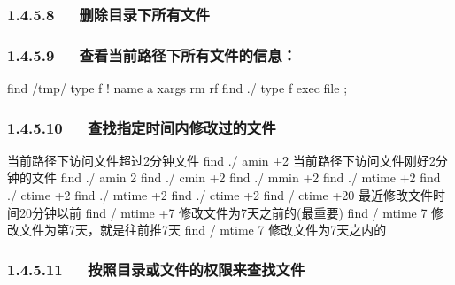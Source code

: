 \documentclass[letterpaper,12pt,english]{sphinxmanual}
\begin{document}
\subsubsection{1.4.5.8   删除目录下所有文件}
\label{\detokenize{001software/001install/linux:id12}}
\begin{sphinxVerbatim}[commandchars=\\\{\}]
        \PYGZbs{}
       
\end{sphinxVerbatim}


\subsubsection{1.4.5.9   查看当前路径下所有文件的信息：}
\label{\detokenize{001software/001install/linux:id13}}
\begin{sphinxVerbatim}[commandchars=\\\{\}]
find /tmp/ \PYGZhy{}type f ! \PYGZhy{}name a \textbar{}xargs rm \textendash{}rf
find ./ \PYGZhy{}type f \PYGZhy{}exec file \PYGZob{}\PYGZcb{} \PYGZbs{};
\end{sphinxVerbatim}


\subsubsection{1.4.5.10   查找指定时间内修改过的文件}
\label{\detokenize{001software/001install/linux:id14}}
\begin{sphinxVerbatim}[commandchars=\\\{\}]
\PYGZsh{} 当前路径下访问文件超过2分钟文件
find ./ \PYGZhy{}amin +2
\PYGZsh{} 当前路径下访问文件刚好2分钟的文件
find ./ \PYGZhy{}amin 2
find ./ \PYGZhy{}cmin +2
find ./ \PYGZhy{}mmin +2
find ./ \PYGZhy{}mtime +2
find ./ \PYGZhy{}ctime +2
find ./ \PYGZhy{}mtime +2
find ./ \PYGZhy{}ctime +2
find / \PYGZhy{}ctime  +20  最近修改文件时间20分钟以前
find / \PYGZhy{}mtime  +7   修改文件为7天之前的(最重要)
find / \PYGZhy{}mtime  7    修改文件为第7天，就是往前推7天
find / \PYGZhy{}mtime  \PYGZhy{}7   修改文件为7天之内的
\end{sphinxVerbatim}


\subsubsection{1.4.5.11   按照目录或文件的权限来查找文件}
\label{\detokenize{001software/001install/linux:id15}}
\begin{sphinxVerbatim}[commandchars=\\\{\}]
   
\end{sphinxVerbatim}
\end{document}

